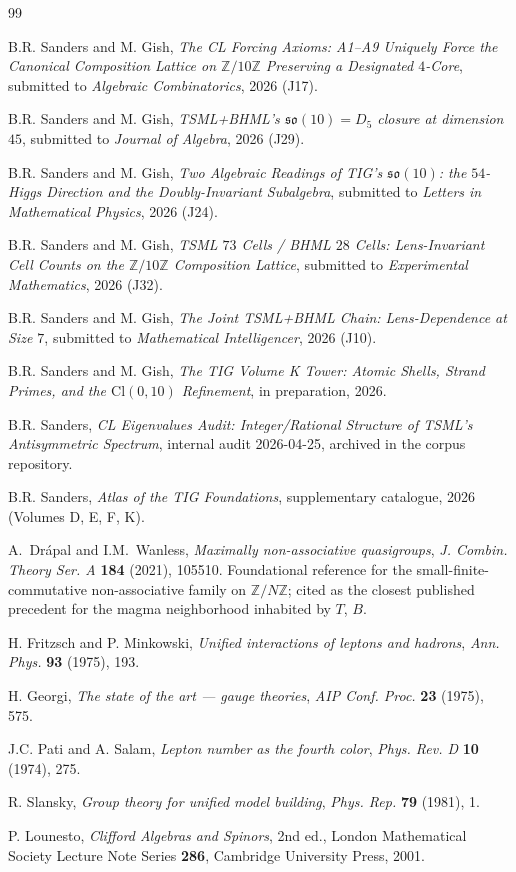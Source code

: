 \documentclass[11pt,reqno]{amsart}
\theoremstyle{definition}
\newcommand{\Z}{\mathbb{Z}}
\newcommand{\so}{\mathfrak{so}}
\newcommand{\Cl}{\mathrm{Cl}}
\newcommand{\TSML}{T}
\newcommand{\BHML}{B}
\begin{document}
\begin{thebibliography}{99}

B.R. Sanders and M. Gish, \emph{The CL Forcing Axioms: A1--A9
Uniquely Force the Canonical Composition Lattice on $\Z/10\Z$
Preserving a Designated $4$-Core}, submitted to
\emph{Algebraic Combinatorics}, 2026 (J17).

B.R. Sanders and M. Gish, \emph{TSML+BHML's $\so(10) = D_5$
closure at dimension $45$}, submitted to \emph{Journal of Algebra},
2026 (J29).

B.R. Sanders and M. Gish, \emph{Two Algebraic Readings of TIG's
$\so(10)$: the $54$-Higgs Direction and the Doubly-Invariant
Subalgebra}, submitted to \emph{Letters in Mathematical Physics},
2026 (J24).

B.R. Sanders and M. Gish, \emph{TSML $73$ Cells / BHML $28$ Cells:
Lens-Invariant Cell Counts on the $\Z/10\Z$ Composition Lattice},
submitted to \emph{Experimental Mathematics}, 2026 (J32).

B.R. Sanders and M. Gish, \emph{The Joint TSML+BHML Chain:
Lens-Dependence at Size $7$}, submitted to \emph{Mathematical
Intelligencer}, 2026 (J10).

B.R. Sanders and M. Gish, \emph{The TIG Volume K Tower: Atomic
Shells, Strand Primes, and the $\Cl(0, 10)$ Refinement},
in preparation, 2026.

B.R. Sanders, \emph{CL Eigenvalues Audit: Integer/Rational
Structure of TSML's Antisymmetric Spectrum}, internal audit
2026-04-25, archived in the corpus repository.

B.R. Sanders, \emph{Atlas of the TIG Foundations}, supplementary
catalogue, 2026 (Volumes D, E, F, K).

A.~Drápal and I.M.~Wanless, \emph{Maximally non-associative
quasigroups}, \emph{J. Combin. Theory Ser. A} \textbf{184} (2021),
105510. Foundational reference for the small-finite-commutative
non-associative family on $\Z/N\Z$; cited as the closest published
precedent for the magma neighborhood inhabited by $\TSML$, $\BHML$.

H. Fritzsch and P. Minkowski, \emph{Unified interactions of leptons
and hadrons}, \emph{Ann. Phys.} \textbf{93} (1975), 193.

H. Georgi, \emph{The state of the art --- gauge theories},
\emph{AIP Conf. Proc.} \textbf{23} (1975), 575.

J.C. Pati and A. Salam, \emph{Lepton number as the fourth color},
\emph{Phys. Rev. D} \textbf{10} (1974), 275.

R. Slansky, \emph{Group theory for unified model building},
\emph{Phys. Rep.} \textbf{79} (1981), 1.

P. Lounesto, \emph{Clifford Algebras and Spinors}, 2nd ed.,
London Mathematical Society Lecture Note Series \textbf{286},
Cambridge University Press, 2001.

\end{thebibliography}
\end{document}
